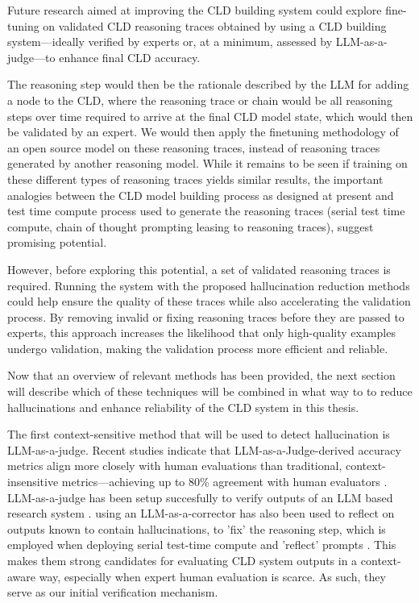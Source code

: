 Future research aimed at improving the CLD building system could explore fine-tuning on validated CLD reasoning traces obtained by using a CLD building system—ideally verified by experts or, at a minimum, assessed by LLM-as-a-judge—to enhance final CLD accuracy. 

The reasoning step would then be the rationale described by the LLM for adding a node to the CLD, where the reasoning trace or chain would be all reasoning steps over time required to arrive at the final CLD model state, which would then be validated by an expert. We would then apply the finetuning methodology of an open source model on these reasoning traces, instead of reasoning traces generated by another reasoning model. While it remains to be seen if training on these different types of reasoning traces yields similar results, the important analogies between the CLD model building process as designed at present and test time compute process used to generate the reasoning traces (serial test time compute, chain of thought prompting leasing to reasoning traces), suggest promising potential.

However, before exploring this potential, a set of validated reasoning traces is required. Running the system with the proposed hallucination reduction methods could help ensure the quality of these traces while also accelerating the validation process. By removing invalid or fixing reasoning traces before they are passed to experts, this approach increases the likelihood that only high-quality examples undergo validation, making the validation process more efficient and reliable.

Now that an overview of relevant methods has been provided, the next section will describe which of these techniques will be combined in what way to to reduce hallucinations and enhance reliability of the CLD system in this thesis.

The first context-sensitive method that will be used to detect hallucination is LLM-as-a-judge.
Recent studies indicate that LLM-as-a-Judge-derived accuracy metrics align more closely with human evaluations than traditional, context-insensitive metrics—achieving up to 80\% agreement with human evaluators \cite{li2024llms}. LLM-as-a-judge has been setup succesfully to verify outputs of an LLM based research system \cite{lu2024ai}. using an LLM-as-a-corrector has also been used to reflect on outputs known to contain hallucinations, to 'fix' the reasoning step, which is employed when deploying serial test-time compute and 'reflect' prompts \cite{shinn2024reflexion,varshney2023stitch,wei2022chain}. This makes them strong candidates for evaluating CLD system outputs in a context-aware way, especially when expert human evaluation is scarce. As such, they serve as our initial verification mechanism. 


